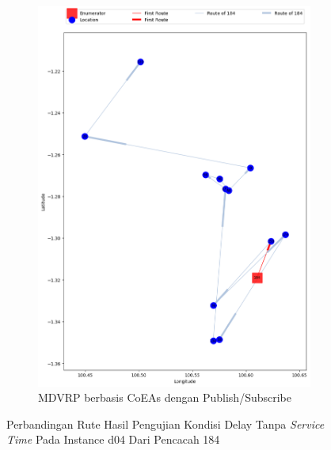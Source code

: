 \begin{figure}[H]\ContinuedFloat
	\centering
	\begin{subfigure}[t]{\textwidth}
		\centering
		\includegraphics[width=\textwidth]{Resources/Images/delayed_5/real_m15_n100_delayed_5_184_pubsub_coes}
		\caption{MDVRP berbasis CoEAs dengan Publish/Subscribe}
		\label{fig:real_m15_n100_delayed_5_184_pubsub_coes}
	\end{subfigure}
	\caption{Perbandingan Rute Hasil Pengujian Kondisi Delay Tanpa \textit{Service Time} Pada Instance d04 Dari Pencacah 184}
	\label{fig:real_m15_n100_delayed_5_184_contd}
\end{figure}


